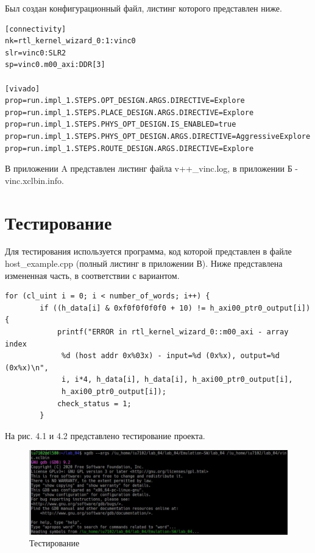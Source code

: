 Был создан конфигурационный файл, листинг которого представлен ниже.

\begin{lstlisting}[label=code, caption=Листинг конфигурационного файла rtl\_kernel\_wizard\_0.cfg]
[connectivity]
nk=rtl_kernel_wizard_0:1:vinc0
slr=vinc0:SLR2
sp=vinc0.m00_axi:DDR[3]

[vivado]
prop=run.impl_1.STEPS.OPT_DESIGN.ARGS.DIRECTIVE=Explore
prop=run.impl_1.STEPS.PLACE_DESIGN.ARGS.DIRECTIVE=Explore
prop=run.impl_1.STEPS.PHYS_OPT_DESIGN.IS_ENABLED=true
prop=run.impl_1.STEPS.PHYS_OPT_DESIGN.ARGS.DIRECTIVE=AggressiveExplore
prop=run.impl_1.STEPS.ROUTE_DESIGN.ARGS.DIRECTIVE=Explore
\end{lstlisting}

В приложении A представлен листинг файла v++\_vinc.log, в приложении Б - vinc.xclbin.info.

\chapter{Тестирование}

Для тестирования используется программа, код которой представлен в файле host\_example.cpp (полный листинг в приложении В). Ниже представлена измененная часть, в соответствии с вариантом.
\begin{lstlisting}[label=code, caption=Модифицированный модуль host\_example.cpp]
for (cl_uint i = 0; i < number_of_words; i++) {
        if ((h_data[i] & 0xf0f0f0f0f0 + 10) != h_axi00_ptr0_output[i]) {
            printf("ERROR in rtl_kernel_wizard_0::m00_axi - array index
             %d (host addr 0x%03x) - input=%d (0x%x), output=%d (0x%x)\n",
             i, i*4, h_data[i], h_data[i], h_axi00_ptr0_output[i],
             h_axi00_ptr0_output[i]);
            check_status = 1;
		}
\end{lstlisting}

На рис. 4.1 и 4.2 представлено тестирование проекта.

\begin{figure}[H]
	\begin{center}
		\includegraphics[scale=0.6]{assets/gdb_start.png}
	\end{center}
	\caption{Тестирование}
\end{figure}

